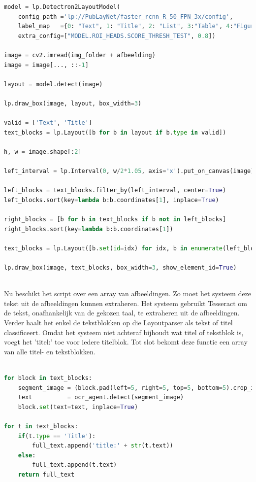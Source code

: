 \begin{lstlisting}[language=Python, caption={Een PDF inlezen met OCR}, label={code:reader-ocr}]
model = lp.Detectron2LayoutModel(
	config_path ='lp://PubLayNet/faster_rcnn_R_50_FPN_3x/config',
	label_map   ={0: "Text", 1: "Title", 2: "List", 3:"Table", 4:"Figure"}, 
	extra_config=["MODEL.ROI_HEADS.SCORE_THRESH_TEST", 0.8])

image = cv2.imread(img_folder + afbeelding)
image = image[..., ::-1]
	
layout = model.detect(image)
	
lp.draw_box(image, layout, box_width=3)
	
valid = ['Text', 'Title']
text_blocks = lp.Layout([b for b in layout if b.type in valid])
	
h, w = image.shape[:2]
	
left_interval = lp.Interval(0, w/2*1.05, axis='x').put_on_canvas(image)
	
left_blocks = text_blocks.filter_by(left_interval, center=True)
left_blocks.sort(key=lambda b:b.coordinates[1], inplace=True)
	
right_blocks = [b for b in text_blocks if b not in left_blocks]
right_blocks.sort(key=lambda b:b.coordinates[1])
	
text_blocks = lp.Layout([b.set(id=idx) for idx, b in enumerate(left_blocks+right_blocks)])
	
lp.draw_box(image, text_blocks, box_width=3, show_element_id=True)
	
\end{lstlisting}

Nu beschikt het script over een array van afbeeldingen. Zo moet het systeem deze tekst uit de afbeeldingen kunnen extraheren. Het systeem gebruikt Tesseract om de tekst, onafhankelijk van de gekozen taal, te extraheren uit de afbeeldingen. Verder haalt het enkel de tekstblokken op die Layoutparser als tekst of titel classificeert. Omdat het systeem niet achteraf bijhoudt wat titel of tekstblok is, voegt het 'titel:' toe voor iedere titelblok. Tot slot bekomt deze functie een array van alle titel- en tekstblokken.

\begin{lstlisting}[language=Python, caption={Tekst extraheren uit de geparsete inhoud.}, label={code:text-collecting}
language = language
ocr_agent = lp.TesseractAgent(languages=language)

full_text = []
	
for block in text_blocks:
	segment_image = (block.pad(left=5, right=5, top=5, bottom=5).crop_image(image))
	text          = ocr_agent.detect(segment_image)
	block.set(text=text, inplace=True)
	
for t in text_blocks:
	if(t.type == 'Title'):
		full_text.append('title:' + str(t.text))
	else:
		full_text.append(t.text)    
	return full_text
\end{lstlisting}


